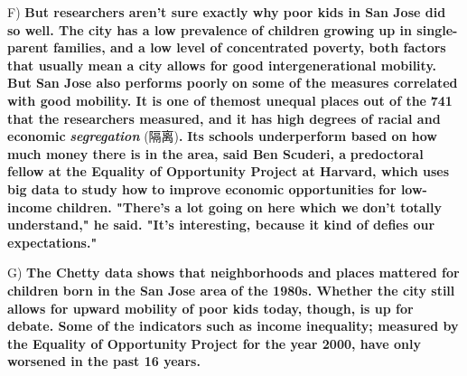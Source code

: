 \documentclass[UTF8,11pt]{ctexart}
\begin{document}
F) \textbf{But researchers aren't sure exactly why poor kids in San Jose did so well. The city has a low prevalence} \textbf{of children growing up in single-parent families, and a low level of concentrated poverty, both factors} \textbf{that usually mean a city allows for good intergenerational mobility. But San Jose also performs poorly} \textbf{on some of the measures correlated with good mobility. It is one of the\textperiodcentered{}most unequal places out of the} \textbf{741 that the researchers measured, and it has high degrees of racial and economic }\textbf{\textit{segregation }}(隔离)\textbf{.} \textbf{Its schools underperform based on how much money there is in the area, said Ben Scuderi, a} \textbf{predoctoral fellow at the Equality of Opportunity Project at Harvard, which uses big data to study how} \textbf{to improve economic opportunities for low-income children. "There's a lot going on here which we} \textbf{don't totally understand," he said. "It's interesting, because it kind of defies our expectations."}


G) \textbf{The Chetty data shows that neighborhoods and places mattered for children born in the San Jose area} \textbf{of the 1980s. Whether the city still allows for upward mobility of poor kids today, though, is up for} \textbf{debate. Some of the indicators such as income inequality; measured by the Equality of Opportunity} \textbf{Project for the year 2000, have only worsened in the past 16 years.}
\end{document}
